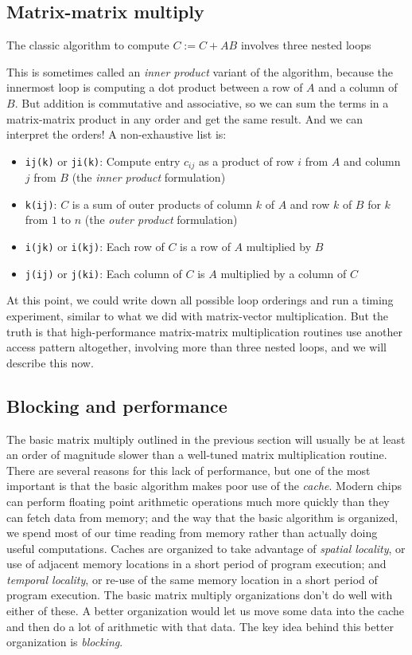 \documentclass[12pt, leqno]{article} %
\begin{document}

\subsection{Matrix-matrix multiply}

The classic algorithm to compute $C := C + AB$ involves
three nested loops

This is sometimes called an {\em inner product} variant of
the algorithm, because the innermost loop is computing a dot
product between a row of $A$ and a column of $B$.  But
addition is commutative and associative, so we can sum the
terms in a matrix-matrix product in any order and get the same
result.  And we can interpret the orders!  A non-exhaustive
list is:
\begin{itemize}
\item {\tt ij(k)} or {\tt ji(k)}: Compute entry $c_{ij}$ as a
  product of row $i$ from $A$ and column $j$ from $B$
  (the {\em inner product} formulation)
\item {\tt k(ij)}: $C$ is a sum of outer products of column $k$
  of $A$ and row $k$ of $B$ for $k$ from $1$ to $n$
  (the {\em outer product} formulation)
\item {\tt i(jk)} or {\tt i(kj)}: Each row of $C$ is a row of
  $A$ multiplied by $B$
\item {\tt j(ij)} or {\tt j(ki)}: Each column of $C$ is $A$
  multiplied by a column of $C$
\end{itemize}
At this point, we could write down all possible loop orderings
and run a timing experiment, similar to what we did with
matrix-vector multiplication.  But the truth is that high-performance
matrix-matrix multiplication routines use another access pattern
altogether, involving more than three nested loops, and we will
describe this now.

\subsection{Blocking and performance}

The basic matrix multiply outlined in the previous section will
usually be at least an order of magnitude slower than a well-tuned
matrix multiplication routine.  There are several reasons for this
lack of performance, but one of the most important is that the basic
algorithm makes poor use of the {\em cache}.
Modern chips can perform floating point arithmetic operations much
more quickly than they can fetch data from memory; and the way that
the basic algorithm is organized, we spend most of our time reading
from memory rather than actually doing useful computations.
Caches are organized to take advantage of {\em spatial locality},
or use of adjacent memory locations in a short period of program execution;
and {\em temporal locality}, or re-use of the same memory location in a
short period of program execution.  The basic matrix multiply organizations
don't do well with either of these.
A better organization would let us move some data into the cache
and then do a lot of arithmetic with that data.  The key idea behind
this better organization is {\em blocking}.
\end{document}
